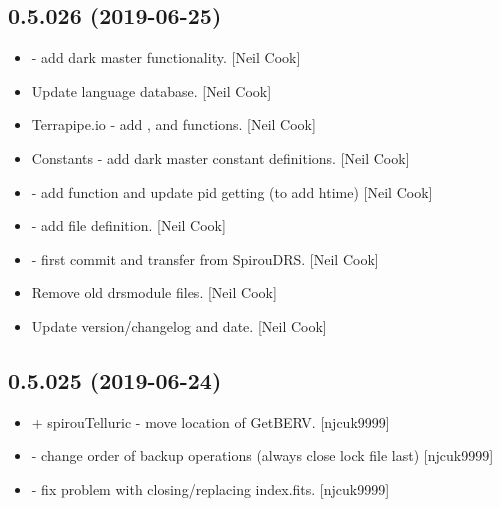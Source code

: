 \documentclass[a4paper,10pt,english]{report}
\begin{document}
\subsection{0.5.026 (2019-06-25)}
\label{\detokenize{misc/changelog:id110}}\begin{itemize}
\item {} 
 - add dark master functionality. {[}Neil Cook{]}

\item {} 
Update language database. {[}Neil Cook{]}

\item {} 
Terrapipe.io - add ,  and 
functions. {[}Neil Cook{]}

\item {} 
Constants - add dark master constant definitions. {[}Neil Cook{]}

\item {} 
 - add function  and update pid
getting (to add htime) {[}Neil Cook{]}

\item {} 
 - add  file definition. {[}Neil Cook{]}

\item {} 
 - first commit and transfer from SpirouDRS.
{[}Neil Cook{]}

\item {} 
Remove old drsmodule files. {[}Neil Cook{]}

\item {} 
Update version/changelog and date. {[}Neil Cook{]}

\end{itemize}


\subsection{0.5.025 (2019-06-24)}
\label{\detokenize{misc/changelog:id111}}\begin{itemize}
\item {} 
 + spirouTelluric - move location of GetBERV.
{[}njcuk9999{]}

\item {} 
 - change order of backup operations (always close lock
file last) {[}njcuk9999{]}

\item {} 
 - fix problem with closing/replacing index.fits.
{[}njcuk9999{]}

\end{itemize}
\end{document}
